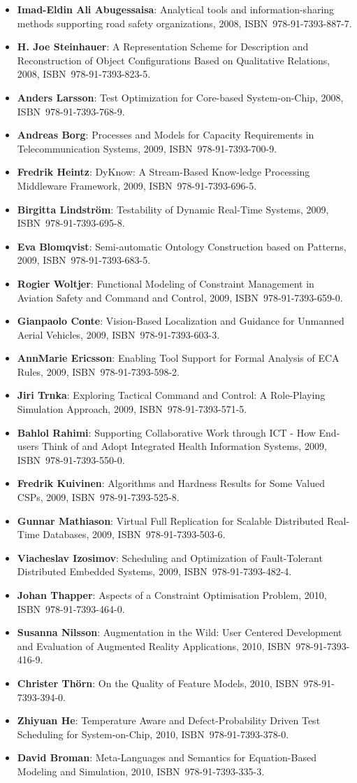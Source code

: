 \documentclass[a4paper,showtrims,twocolumn]{memoir}
\newenvironment{theses}{
  \begin{itemize}
    \setlength{\itemsep}{0.2em}
    \setlength{\parskip}{0em}
    \setlength{\parsep}{0em}
}{
  \end{itemize}
}
\newcommand{\thesis}[5]{\item[No.~#1] \textbf{#2}: #3, #4, ISBN~#5.}
\begin{document}
\begin{theses}
    \thesis{1187}{Imad-Eldin Ali Abugessaisa}{Analytical tools and information-sharing methods supporting road safety organizations}{2008}{978-91-7393-887-7}
    \thesis{1204}{H. Joe Steinhauer}{A Representation Scheme for Description and Reconstruction of Object Configurations Based on Qualitative Relations}{2008}{978-91-7393-823-5}
    \thesis{1222}{Anders Larsson}{Test Optimization for Core-based System-on-Chip}{2008}{978-91-7393-768-9}
    \thesis{1238}{Andreas Borg}{Processes and Models for Capacity Requirements in Telecommunication Systems}{2009}{978-91-7393-700-9}
    \thesis{1240}{Fredrik Heintz}{DyKnow: A Stream-Based Know-ledge Processing Middleware Framework}{2009}{978-91-7393-696-5}
    \thesis{1241}{Birgitta Lindström}{Testability of Dynamic Real-Time Systems}{2009}{978-91-7393-695-8}
    \thesis{1244}{Eva Blomqvist}{Semi-automatic Ontology Construction based on Patterns}{2009}{978-91-7393-683-5}
    \thesis{1249}{Rogier Woltjer}{Functional Modeling of Constraint Management in Aviation Safety and Command and Control}{2009}{978-91-7393-659-0}
    \thesis{1260}{Gianpaolo Conte}{Vision-Based Localization and Guidance for Unmanned Aerial Vehicles}{2009}{978-91-7393-603-3}
    \thesis{1262}{AnnMarie Ericsson}{Enabling Tool Support for Formal Analysis of ECA Rules}{2009}{978-91-7393-598-2}
    \thesis{1266}{Jiri Trnka}{Exploring Tactical Command and Control: A Role-Playing Simulation Approach}{2009}{978-91-7393-571-5}
    \thesis{1268}{Bahlol Rahimi}{Supporting Collaborative Work through ICT - How End-users Think of and Adopt Integrated Health Information Systems}{2009}{978-91-7393-550-0}
    \thesis{1274}{Fredrik Kuivinen}{Algorithms and Hardness Results for Some Valued CSPs}{2009}{978-91-7393-525-8}
    \thesis{1281}{Gunnar Mathiason}{Virtual Full Replication for Scalable Distributed Real-Time Databases}{2009}{978-91-7393-503-6}
    \thesis{1290}{Viacheslav Izosimov}{Scheduling and Optimization of Fault-Tolerant Distributed Embedded Systems}{2009}{978-91-7393-482-4}
    \thesis{1294}{Johan Thapper}{Aspects of a Constraint Optimisation Problem}{2010}{978-91-7393-464-0}
    \thesis{1306}{Susanna Nilsson}{Augmentation in the Wild: User Centered Development and Evaluation of Augmented Reality Applications}{2010}{978-91-7393-416-9}
    \thesis{1313}{Christer Thörn}{On the Quality of Feature Models}{2010}{978-91-7393-394-0}
    \thesis{1321}{Zhiyuan He}{Temperature Aware and Defect-Probability Driven Test Scheduling for System-on-Chip}{2010}{978-91-7393-378-0}
    \thesis{1333}{David Broman}{Meta-Languages and Semantics for Equation-Based Modeling and Simulation}{2010}{978-91-7393-335-3}

\end{theses}
\end{document}
